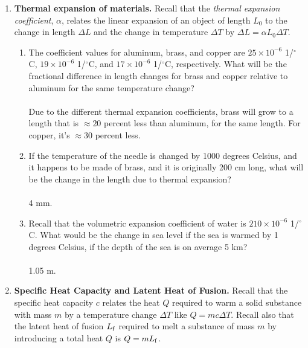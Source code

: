 \documentclass[10pt]{article}
\begin{document}
\maketitle

\begin{enumerate}
\item \textbf{Thermal expansion of materials.}  Recall that the \textit{thermal expansion coefficient}, $\alpha$, relates the linear expansion of an object of length $L_0$ to the change in length $\Delta L$ and the change in temperature $\Delta T$ by $\Delta L = \alpha L_0 \Delta T$.
\begin{enumerate}
\item The coefficient values for aluminum, brass, and copper are $25 \times 10^{-6}$ 1/$^{\circ}$C, $19 \times 10^{-6}$ 1/$^{\circ}$C, and $17 \times 10^{-6}$ 1/$^{\circ}$C, respectively.  What will be the fractional difference in length changes for brass and copper relative to aluminum for the same temperature change? \\ \\ Due to the different thermal expansion coefficients, brass will grow to a length that is $\approx 20$ percent less than aluminum, for the same length.  For copper, it's $\approx 30$ percent less. \\
\item If the temperature of the needle is changed by 1000 degrees Celsius, and it happens to be made of brass, and it is originally 200 cm long, what will be the change in the length due to thermal expansion? \\ \\ 4 mm. \\
\item Recall that the volumetric expansion coefficient of water is $210 \times 10^{-6}$ 1/$^{\circ}$C.  What would be the change in sea level if the sea is warmed by 1 degrees Celsius, if the depth of the sea is on average 5 km? \\ \\ 1.05 m. \\
\end{enumerate}
\item \textbf{Specific Heat Capacity and Latent Heat of Fusion.}  Recall that the specific heat capacity $c$ relates the heat $Q$ required to warm a solid substance with mass $m$ by a temperature change $\Delta T$ like $Q = m c \Delta T$.  Recall also that the latent heat of fusion $L_{\rm f}$ required to melt a substance of mass $m$ by introducing a total heat $Q$ is $Q = m L_{\rm f}$.

\end{enumerate}
\end{document}
